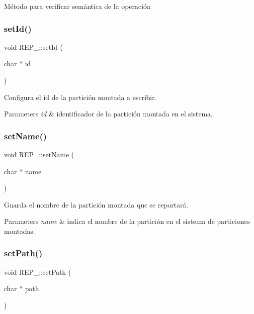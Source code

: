Método para verificar semántica de la operación \mbox{\label{classREP___a42631749f8e85ecee3d125f2db1167f0}} 
\subsubsection{\texorpdfstring{set\+Id()}{setId()}}
{\footnotesize\ttfamily void R\+E\+P\+\_\+\+::set\+Id (\begin{DoxyParamCaption}\item[{char $\ast$}]{id }\end{DoxyParamCaption})}

Configura el id de la partición montada a escribir. 
\begin{DoxyParams}{Parameters}
{\em id} & identificador de la partición montada en el sistema. \\
\hline
\end{DoxyParams}
\mbox{\label{classREP___ad66a2155dafd5a9ca0cec161e42ddd3e}} 
\subsubsection{\texorpdfstring{set\+Name()}{setName()}}
{\footnotesize\ttfamily void R\+E\+P\+\_\+\+::set\+Name (\begin{DoxyParamCaption}\item[{char $\ast$}]{name }\end{DoxyParamCaption})\hspace{0.3cm}{\ttfamily [inline]}}

Guarda el nombre de la partición montada que se reportará. 
\begin{DoxyParams}{Parameters}
{\em name} & indica el nombre de la partición en el sistema de particiones montadas. \\
\hline
\end{DoxyParams}
\mbox{\label{classREP___aad647454ea8a5ef1d8b962f785af7bb8}} 
\subsubsection{\texorpdfstring{set\+Path()}{setPath()}}
{\footnotesize\ttfamily void R\+E\+P\+\_\+\+::set\+Path (\begin{DoxyParamCaption}\item[{char $\ast$}]{path }\end{DoxyParamCaption})}

